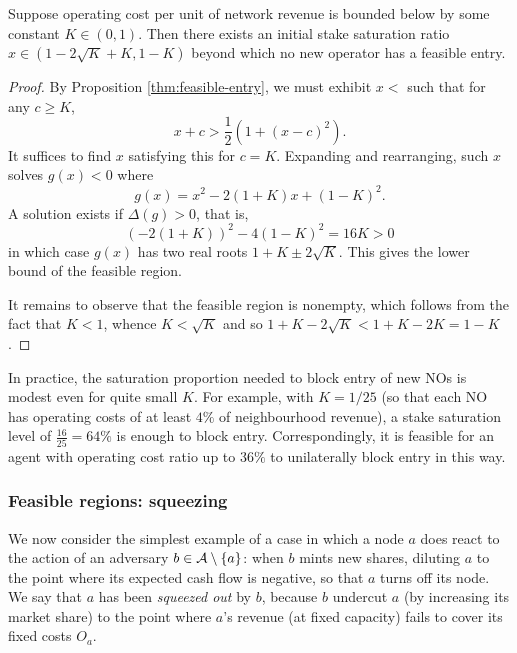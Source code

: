 \begin{corollary}
  \label{thm:entry-blocking-ratio}

  Suppose operating cost per unit of network revenue is bounded below by some constant $K\in(0,1)$.
  Then there exists an initial stake saturation ratio $x\in(1-2\sqrt{K}+K,1-K)$ beyond which no new operator has a feasible entry.

\end{corollary}
%
\begin{proof}

  By Proposition \ref{thm:feasible-entry}, we must exhibit $x<$ such that for any $c\geq K$,
  \[
    x + c > \frac{1}{2}(1 + (x-c)^2).
  \]
  It suffices to find $x$ satisfying this for $c=K$.
  Expanding and rearranging, such $x$ solves $g(x)<0$ where
  \[
    g(x) = x^2 - 2(1+K) x + (1-K)^2.
  \]
  A solution exists if $\Delta(g)>0$, that is,
  \[
    (-2(1+K))^2 - 4(1-K)^2  = 16K > 0
  \]
  in which case $g(x)$ has two real roots $1 + K \pm 2\sqrt{K}$.
  This gives the lower bound of the feasible region.
  
  It remains to observe that the feasible region is nonempty, which follows from the fact that $K<1$, whence $K<\sqrt{K}$ and so $1+K-2\sqrt{K}<1+K-2K=1-K$.\qedhere

\end{proof}

\begin{example}

  In practice, the saturation proportion needed to block entry of new NOs is modest even for quite small $K$.
  For example, with $K=1/25$ (so that each NO has operating costs of at least $4\%$ of neighbourhood revenue), a stake saturation level of $\frac{16}{25}=64\%$ is enough to block entry.
  Correspondingly, it is feasible for an agent with operating cost ratio up to $36\%$ to unilaterally block entry in this way.

\end{example}


\subsubsection{Feasible regions: squeezing}
\label{section:squeezing}

We now consider the simplest example of a case in which a node $a$ does react to the action of an adversary $b\in\mathcal{A}\setminus\{a\}$: when $b$ mints new shares, diluting $a$ to the point where its expected cash flow is negative, so that $a$ turns off its node.
%
We say that $a$ has been \emph{squeezed out} by $b$, because $b$ undercut $a$ (by increasing its market share) to the point where $a$'s revenue (at fixed capacity) fails to cover its fixed costs $O_a$.

